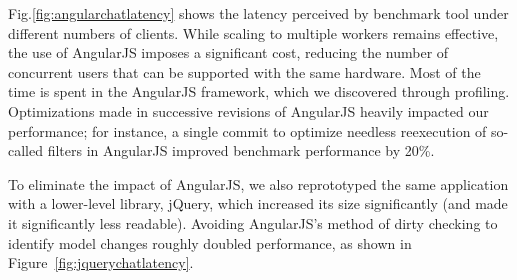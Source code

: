 Fig.\ref{fig:angularchatlatency} shows the latency perceived by benchmark tool
under different numbers of clients. While scaling to multiple workers remains effective,
the use of AngularJS imposes a significant cost, reducing the number of concurrent users 
that can be supported with the same hardware.  Most of the time is spent in the AngularJS
framework, which we discovered through profiling.  Optimizations made in successive revisions
of AngularJS heavily impacted our performance; for instance, a single commit to optimize
needless reexecution of so-called filters in AngularJS improved benchmark performance by 20\%.

\jquerychatlatency{}
To eliminate the impact of AngularJS, we also reprototyped the same application with a
lower-level library, jQuery, which increased its size significantly (and made it significantly
less readable).  Avoiding AngularJS's method of dirty checking to identify model changes
roughly doubled performance, as shown in Figure~\ref{fig:jquerychatlatency}.


